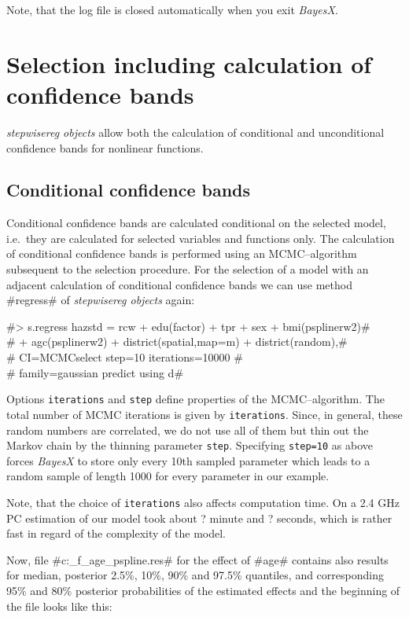\documentclass[11pt,a4paper,twoside]{bayesxreport}
\begin{document}
Note, that the log file is closed automatically when you exit {\em
BayesX}.


\section{Selection including calculation of confidence bands}\label{zambia_step_confidence}

{\it stepwisereg objects} allow both the calculation of conditional
and unconditional confidence bands for nonlinear functions.

\subsection{Conditional confidence bands}\label{zambia_step_cond}

Conditional confidence bands are calculated conditional on the
selected model, i.e.~they are calculated for selected variables and
functions only. The calculation of conditional confidence bands is
performed using an MCMC--algorithm subsequent to the selection
procedure. For the selection of a model with an adjacent calculation
of conditional confidence bands we can use method #regress# of {\em
stepwisereg objects} again:

 #> s.regress hazstd = rcw + edu(factor) + tpr + sex + bmi(psplinerw2)#\\
 #  + agc(psplinerw2) + district(spatial,map=m) + district(random),#\\
 #  CI=MCMCselect step=10 iterations=10000 #\\
 #  family=gaussian predict using d#

Options {\tt iterations} and {\tt step} define properties of the
MCMC--algorithm. The total number of MCMC iterations is given by
{\tt iterations}. Since, in general, these random numbers are
correlated, we do not use all of them but thin out the Markov chain
by the thinning parameter {\tt step}. Specifying {\tt step=10} as
above forces {\em BayesX} to store only every 10th sampled parameter
which leads to a random sample of length 1000 for every parameter in
our example.

Note, that the choice of {\tt iterations} also affects computation
time. On a 2.4 GHz PC estimation of our model took about ? minute
and ? seconds, which is rather fast in regard of the complexity of
the model.

Now, file #c:\data\s_f_age_pspline.res# for the effect of #age#
contains also results for median, posterior 2.5\%, 10\%, 90\% and
97.5\% quantiles, and corresponding 95\% and 80\% posterior
probabilities of the estimated effects and the beginning of the file
looks like this:
\end{document}
